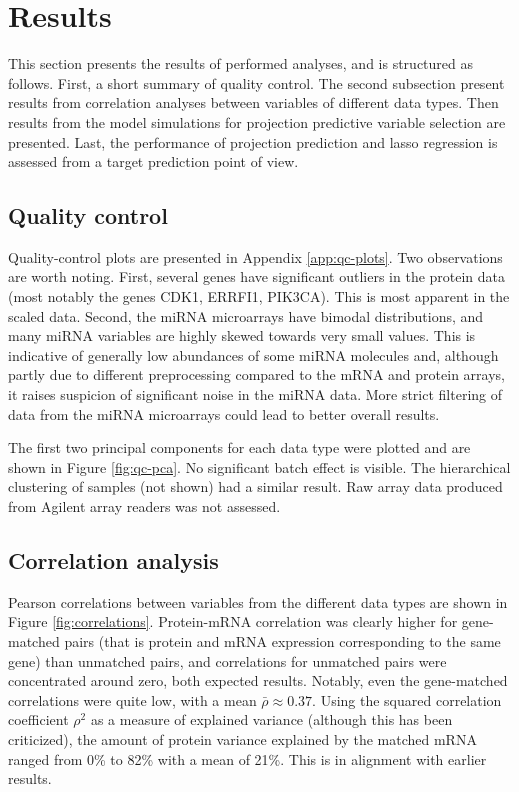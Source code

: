 
\section{Results}

This section presents the results of performed analyses, and is structured as
follows. First, a short summary of quality control. The second subsection
present results from correlation analyses between variables of different data
types. Then results from the model simulations for projection predictive
variable selection are presented. Last, the performance of projection
prediction and lasso regression is assessed from a target prediction point of
view.




\subsection{Quality control}

Quality-control plots are presented in Appendix \ref{app:qc-plots}. Two
observations are worth noting. First, several genes have significant outliers
in the protein data (most notably the genes CDK1, ERRFI1, PIK3CA). This is
most apparent in the scaled data. Second, the miRNA microarrays have bimodal
distributions, and many miRNA variables are highly skewed towards very small
values. This is indicative of generally low abundances of some miRNA molecules
and, although partly due to different preprocessing compared to the mRNA and
protein arrays, it raises suspicion of significant noise in the miRNA data.
More strict filtering of data from the miRNA microarrays could lead to better
overall results.

The first two principal components for each data type were plotted and are
shown in Figure \ref{fig:qc-pca}. No significant batch effect is visible. The
hierarchical clustering of samples (not shown) had a similar result.
Raw array data produced from Agilent array readers was not assessed.




\subsection{Correlation analysis}

Pearson correlations between variables from the different data types are shown in Figure
\ref{fig:correlations}. Protein-mRNA correlation was clearly higher for gene-matched pairs
(that is protein and mRNA expression corresponding to the same gene) than unmatched pairs,
and correlations for unmatched pairs were concentrated around zero, both expected
results. Notably, even the gene-matched correlations were quite low, with a
mean $\bar{\rho} \approx 0.37$. Using the squared correlation coefficient $\rho^2$ as a
measure of explained variance (although this has been criticized), the amount
of protein variance explained by the matched mRNA ranged from 0\% to 82\% with a mean of
21\%. This is in alignment with earlier results.

